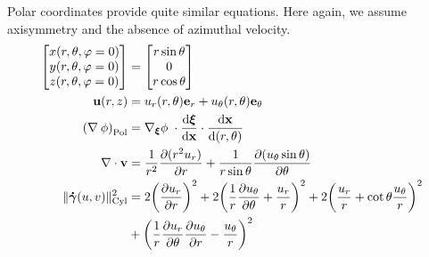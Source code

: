 \documentclass[11 pt]{report}
\begin{document}
Polar coordinates provide quite similar equations. Here again, we assume axisymmetry and the absence of azimuthal velocity.
\begin{align}
    \begin{bmatrix}
        x(r, \theta, \varphi=0) \\
        y(r, \theta, \varphi=0) \\
        z(r, \theta, \varphi=0)
    \end{bmatrix} &=
    \begin{bmatrix}
        r \sin{\theta} \\
        0\\
        r \cos{\theta} \\
    \end{bmatrix}\\
    \mathbf{u}(r, z) &= u_r(r, \theta) \mathbf{e}_r + u_\theta(r, \theta) \mathbf{e}_\theta\\
    \left(\nabla \: \phi\right)_{\text{Pol}} &= \nabla_{\boldsymbol\xi} \phi \; \cdot \dv{\boldsymbol \xi}{\mathbf{x}} \cdot \dv{\mathbf{x}}{(r, \theta)} \\
    \nabla \cdot \mathbf{v} &= \frac{1}{r^2}\pdv{(r^2 u_r)}{r} + \frac{1}{r\sin\theta} \pdv{(u_\theta \sin \theta)}{\theta}\\
    \|\boldsymbol{\dot \gamma}(u, v)\|_{\text{Cyl}}^2 &= 2 \bigg(\pdv{u_r}{r}\bigg)^2 + 2\bigg(\frac{1}{r}\pdv{u_\theta}{\theta} + \frac{u_r}{r}\bigg)^2 + 2\bigg(\frac{u_r}{r} + \cot \theta \frac{u_\theta}{r}\bigg)^2 \nonumber\\
    &+ \bigg(\frac{1}{r}\pdv{u_r}{\theta} \pdv{u_\theta}{r} - \frac{u_\theta}{r}\bigg)^2
\end{align}

%
\end{document}

